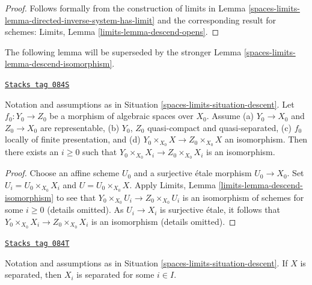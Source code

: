 \begin{proof}
Follows formally from the construction of limits in
Lemma \ref{spaces-limits-lemma-directed-inverse-system-has-limit}
and the corresponding result for schemes:
Limits, Lemma \ref{limits-lemma-descend-opens}.
\end{proof}

The following lemma will be superseded by the stronger
Lemma \ref{spaces-limits-lemma-descend-isomorphism}.

\begin{lemma}
\label{spaces-limits-lemma-descend-equality}
\href{https://stacks.math.columbia.edu/tag/084S}{\texttt{Stacks tag 084S}}

Notation and assumptions as in Situation \ref{spaces-limits-situation-descent}.
Let $f_0 : Y_0 \to Z_0$ be a morphism of algebraic spaces over $X_0$.
Assume (a) $Y_0 \to X_0$ and $Z_0 \to X_0$ are representable, (b)
$Y_0$, $Z_0$ quasi-compact and quasi-separated, (c)
$f_0$ locally of finite presentation, and
(d) $Y_0 \times_{X_0} X \to Z_0 \times_{X_0} X$ an isomorphism.
Then there exists an $i \geq 0$ such that
$Y_0 \times_{X_0} X_i \to Z_0 \times_{X_0} X_i$ is an isomorphism.
\end{lemma}

\begin{proof}
Choose an affine scheme $U_0$ and a surjective \'etale morphism $U_0 \to X_0$.
Set $U_i = U_0 \times_{X_0} X_i$ and $U = U_0 \times_{X_0} X$.
Apply Limits, Lemma \ref{limits-lemma-descend-isomorphism}
to see that $Y_0 \times_{X_0} U_i \to Z_0 \times_{X_0} U_i$
is an isomorphism of schemes for some $i \geq 0$ (details omitted).
As $U_i \to X_i$ is surjective \'etale, it follows that
$Y_0 \times_{X_0} X_i \to Z_0 \times_{X_0} X_i$ is an isomorphism
(details omitted).
\end{proof}

\begin{lemma}
\label{spaces-limits-lemma-descend-separated}
\href{https://stacks.math.columbia.edu/tag/084T}{\texttt{Stacks tag 084T}}

Notation and assumptions as in Situation \ref{spaces-limits-situation-descent}.
If $X$ is separated, then $X_i$ is separated for some $i \in I$.
\end{lemma}

